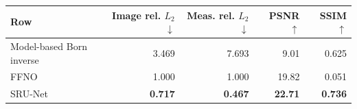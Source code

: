 \begin{tabular}{lrrrr}
\toprule
Row & Image rel. $L_2$ $\downarrow$ & Meas. rel. $L_2$ $\downarrow$ & PSNR $\uparrow$ & SSIM $\uparrow$ \\
\midrule
Model-based Born inverse & 3.469 & 7.693 & 9.01 & 0.625 \\
FFNO & 1.000 & 1.000 & 19.82 & 0.051 \\
SRU-Net & \textbf{0.717} & \textbf{0.467} & \textbf{22.71} & \textbf{0.736} \\
\bottomrule
\end{tabular}
